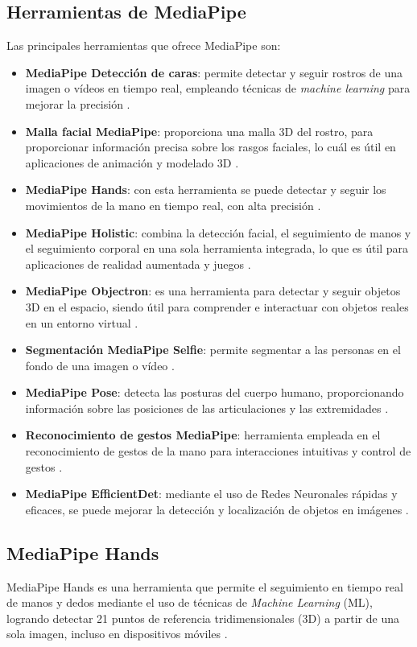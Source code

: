 \subsection{Herramientas de MediaPipe}
Las principales herramientas que ofrece MediaPipe son:
\begin{itemize}
    \item \textbf{MediaPipe Detección de caras}: permite detectar y seguir rostros de una imagen o vídeos en tiempo real, empleando técnicas de \textit{machine learning} para mejorar la precisión \cite{ref49}.
    \item \textbf{Malla facial MediaPipe}: proporciona una malla 3D del rostro, para proporcionar información precisa sobre los rasgos faciales, lo cuál es útil en aplicaciones de animación y modelado 3D \cite{ref49}.
    \item \textbf{MediaPipe Hands}: con esta herramienta se puede detectar y seguir los movimientos de la mano en tiempo real, con alta precisión \cite{ref49}.
    \item \textbf{MediaPipe Holistic}: combina la detección facial, el seguimiento de manos y el seguimiento corporal en una sola herramienta integrada, lo que es útil para aplicaciones de realidad aumentada y juegos \cite{ref49}.
    \item \textbf{MediaPipe Objectron}: es una herramienta para detectar y seguir objetos 3D en el espacio, siendo útil para comprender e interactuar con objetos reales en un entorno virtual \cite{ref49}.
    \item \textbf{Segmentación MediaPipe Selfie}: permite segmentar a las personas en el fondo de una imagen o vídeo \cite{ref49}.
    \item \textbf{MediaPipe Pose}: detecta las posturas del cuerpo humano, proporcionando información sobre las posiciones de las articulaciones y las extremidades \cite{ref49}.
    \item \textbf{Reconocimiento de gestos MediaPipe}: herramienta empleada en el reconocimiento de gestos de la mano para interacciones intuitivas y control de gestos \cite{ref49}.
    \item \textbf{MediaPipe EfficientDet}: mediante el uso de Redes Neuronales rápidas y eficaces, se puede mejorar la detección y localización de objetos en imágenes \cite{ref49}. 

\end{itemize}

\newpage
\subsection{MediaPipe Hands}
MediaPipe Hands es una herramienta que permite el seguimiento en tiempo real de manos y dedos mediante el uso de técnicas de \textit{Machine Learning} (ML), logrando detectar 21 puntos de referencia tridimensionales (3D) a partir de una sola imagen, incluso en dispositivos móviles \cite{ref51}.\\

